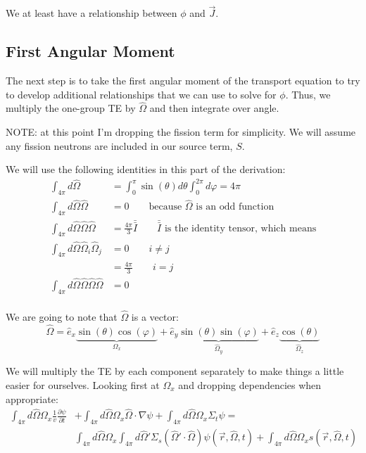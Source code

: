 \documentclass[12pt]{article}
\newlength{\up}
\newcommand{\vOmega}{\ensuremath{\hat{\Omega}}}
\begin{document}
We at least have a relationship between $\phi$ and $\vec{J}$.

\subsection{First Angular Moment}

The next step is to take the first angular moment of the transport equation to try to develop additional relationships that we can use to solve for $\phi$. Thus, we multiply the one-group TE by $\vOmega$ and then integrate over angle. 

NOTE: at this point I'm dropping the fission term for simplicity. We will assume any fission neutrons are included in our source term, $S$. 


We will use the following identities in this part of the derivation:
\begin{align} 
\int_{4\pi} d\vOmega &= \int_0^{\pi} \sin(\theta) d\theta \int_0^{2\pi} d\varphi = 4\pi \\
%
\int_{4\pi} d\vOmega \vOmega &= 0 \qquad \text{because }\vOmega\text{ is an odd function} \\
%
\int_{4\pi} d\vOmega \vOmega \vOmega &= \frac{4\pi}{3}\bar{\bar{I}} \qquad \bar{\bar{I}}\text{ is the identity tensor, which means} \\
%
\int_{4\pi} d\vOmega \vOmega_i \vOmega_j &= 0 \qquad i \neq j \nonumber \\
&= \frac{4\pi}{3} \qquad i = j \nonumber \\
%
\int_{4\pi} d\vOmega \vOmega \vOmega \vOmega &= 0 \qquad \\
\end{align}


We are going to note that $\vOmega$ is a vector:
\[\vOmega = \hat{e}_x \underbrace{\sin(\theta) \cos(\varphi)}_{\Omega_x} 
+ \hat{e}_y \underbrace{\sin(\theta) \sin(\varphi)}_{\vOmega_y}
+ \hat{e}_z \underbrace{\cos(\theta)}_{\vOmega_z} \]

We will multiply the TE by each component separately to make things a little easier for ourselves. Looking first at $\Omega_x$ and dropping dependencies when appropriate:
%
\begin{align}
\int_{4\pi} d\vOmega \Omega_x \frac{1}{v}\frac{\partial \psi}{\partial t} &+ 
\int_{4\pi} d\vOmega \Omega_x \vOmega \cdot \nabla \psi + 
\int_{4\pi} d\vOmega \Omega_x \Sigma_t \psi =\nonumber \\
&\int_{4\pi} d\vOmega \Omega_x \int_{4\pi} d\vOmega' \Sigma_s(\vOmega' \cdot \vOmega) \psi(\vec{r}, \vOmega, t) +
\int_{4\pi} d\vOmega \Omega_x s(\vec{r}, \vOmega, t)
\end{align}
\end{document}
